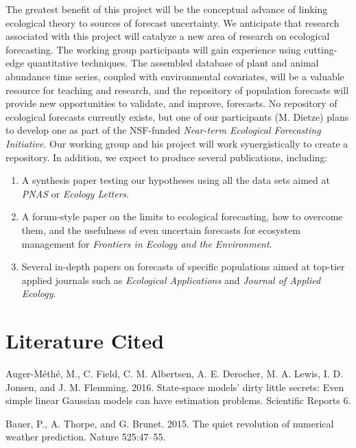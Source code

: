 \documentclass[12pt,]{article}
\providecommand{\tightlist}{%
  \setlength{\itemsep}{0pt}\setlength{\parskip}{0pt}}
\begin{document}
The greatest benefit of this project will be the conceptual advance of
linking ecological theory to sources of forecast uncertainty. We
anticipate that research associated with this project will catalyze a
new area of research on ecological forecasting. The working group
participants will gain experience using cutting-edge quantitative
techniques. The assembled database of plant and animal abundance time
series, coupled with environmental covariates, will be a valuable
resource for teaching and research, and the repository of population
forecasts will provide new opportunities to validate, and improve,
forecasts. No repository of ecological forecasts currently exists, but
one of our participants (M. Dietze) plans to develop one as part of the
NSF-funded \emph{Near-term Ecological Forecasting Initiative}. Our
working group and his project will work synergistically to create a
repository. In addition, we expect to produce several publications,
including:

\begin{enumerate}
\def\labelenumi{\arabic{enumi}.}
\tightlist
\item
  A synthesis paper testing our hypotheses using all the data sets aimed
  at \emph{PNAS} or \emph{Ecology Letters}.
\item
  A forum-style paper on the limits to ecological forecasting, how to
  overcome them, and the usefulness of even uncertain forecasts for
  ecosystem management for \emph{Frontiers in Ecology and the
  Environment}.
\item
  Several in-depth papers on forecasts of specific populations aimed at
  top-tier applied journals such as \emph{Ecological Applications} and
  \emph{Journal of Applied Ecology}.
\end{enumerate}

\section*{Literature Cited}\label{literature-cited}

\hypertarget{refs}{}
\hypertarget{ref-Auger-Methe2016}{}
Auger-Méthé, M., C. Field, C. M. Albertsen, A. E. Derocher, M. A. Lewis,
I. D. Jonsen, and J. M. Flemming. 2016. State-space models' dirty little
secrets: Even simple linear Gaussian models can have estimation
problems. Scientific Reports 6.

\hypertarget{ref-Bauer2015}{}
Bauer, P., A. Thorpe, and G. Brunet. 2015. The quiet revolution of
numerical weather prediction. Nature 525:47--55.
\end{document}
